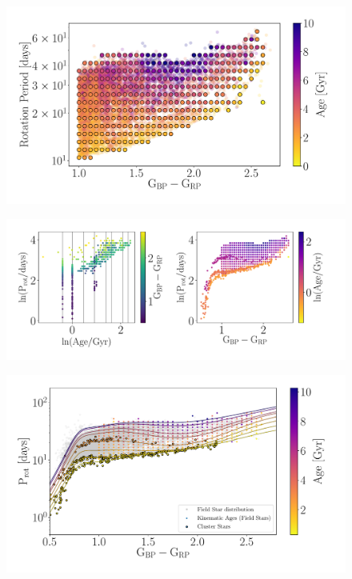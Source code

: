 \begin{figure}
\caption{
}
  \centering \includegraphics[width=1\textwidth]{grid_points}
    \label{fig:grid_points}
\end{figure}

\begin{figure}
\caption{
}
  \centering \includegraphics[width=1\textwidth]{gp_fit_data_multi-panel}
\end{figure}

\begin{figure}
\caption{
}
  \centering \includegraphics[width=1\textwidth]{gp_fit}
\end{figure}
